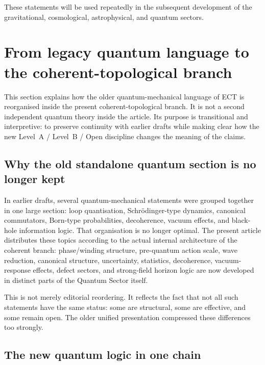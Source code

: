 \documentclass[11pt,a4paper]{article}
\numberwithin{equation}{section}
\begin{document}
These statements will be used repeatedly in the subsequent development
of the gravitational, cosmological, astrophysical, and quantum sectors.

\section{From legacy quantum language to the coherent-topological branch}
\label{sec:quantum_old}

This section explains how the older quantum-mechanical language of ECT
is reorganised inside the present coherent-topological branch.
It is not a second independent quantum theory inside the article.
Its purpose is transitional and interpretive:
to preserve continuity with earlier drafts while making clear how the
new Level~A / Level~B / Open discipline changes the meaning of the
claims.

\subsection*{Why the old standalone quantum section is no longer kept}

In earlier drafts, several quantum-mechanical statements were grouped
together in one large section:
loop quantisation, Schr\"odinger-type dynamics, canonical commutators,
Born-type probabilities, decoherence, vacuum effects, and black-hole
information logic.
That organisation is no longer optimal.
The present article distributes these topics according to the actual
internal architecture of the coherent branch:
phase/winding structure, pre-quantum action scale, wave reduction,
canonical structure, uncertainty, statistics, decoherence,
vacuum-response effects, defect sectors, and strong-field horizon logic
are now developed in distinct parts of the Quantum Sector itself.

This is not merely editorial reordering.
It reflects the fact that not all such statements have the same status:
some are structural, some are effective, and some remain open.
The older unified presentation compressed these differences too strongly.

\subsection*{The new quantum logic in one chain}
\end{document}
